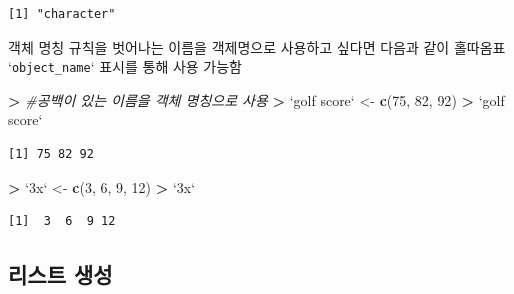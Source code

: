 \documentclass[
  11pt,
]{krantz}
\makeatletter
\newenvironment{Shaded}{\begin{snugshade}}{\end{snugshade}}
\newcommand{\CommentTok}[1]{\textcolor[rgb]{0.37,0.37,0.37}{\textit{#1}}}
\newcommand{\DataTypeTok}[1]{\textcolor[rgb]{0.27,0.27,0.27}{#1}}
\newcommand{\DecValTok}[1]{\textcolor[rgb]{0.06,0.06,0.06}{#1}}
\newcommand{\ErrorTok}[1]{\textcolor[rgb]{0.14,0.14,0.14}{\textbf{#1}}}
\newcommand{\KeywordTok}[1]{\textcolor[rgb]{0.27,0.27,0.27}{\textbf{#1}}}
\newcommand{\NormalTok}[1]{#1}
\newcommand{\OperatorTok}[1]{\textcolor[rgb]{0.43,0.43,0.43}{\textbf{#1}}}
\newcommand{\StringTok}[1]{\textcolor[rgb]{0.5,0.5,0.5}{#1}}
\newenvironment{kframe}{%
\medskip{}
\setlength{\fboxsep}{.8em}
 \def\at@end@of@kframe{}%
 \ifinner\ifhmode%
  \def\at@end@of@kframe{\end{minipage}}%
  \begin{minipage}{\columnwidth}%
 \fi\fi%
 \def\FrameCommand##1{\hskip\@totalleftmargin \hskip-\fboxsep
 \colorbox{shadecolor}{##1}\hskip-\fboxsep
     \hskip-\linewidth \hskip-\@totalleftmargin \hskip\columnwidth}%
 \MakeFramed {\advance\hsize-\width
   \@totalleftmargin\z@ \linewidth\hsize
   \@setminipage}}%
 {\par\unskip\endMakeFramed%
 \at@end@of@kframe}
\newenvironment{rmdblock}[1]
  {
  \begin{itemize}
  \renewcommand{\labelitemi}{
    \raisebox{-.7\height}[0pt][0pt]{
      {\setkeys{Gin}{width=3em,keepaspectratio}\texttt{[image: images/\#1]}}
    }
  }
  \setlength{\fboxsep}{1em}
  \begin{kframe}
  \item
  }
  {
  \end{kframe}
  \end{itemize}
  }
\newenvironment{rmdtip}
  {\begin{rmdblock}{tip}}
  {\end{rmdblock}}
\makeatother
\begin{document}
\begin{verbatim}
[1] "character"
\end{verbatim}

\normalsize

\footnotesize

\begin{rmdtip}
\begin{rmdtip}

객체 명칭 규칙을 벗어나는 이름을 객제명으로 사용하고 싶다면 다음과 같이 홀따옴표 `\texttt{object\_name}` 표시를 통해 사용 가능함

\end{rmdtip}
\end{rmdtip}

\normalsize

\footnotesize

\begin{Shaded}
\begin{Highlighting}[]
\OperatorTok{>}\StringTok{ }\CommentTok{#공백이 있는 이름을 객체 명칭으로 사용}
\ErrorTok{>}\StringTok{ `}\DataTypeTok{golf score}\StringTok{`}\NormalTok{ <-}\StringTok{ }\KeywordTok{c}\NormalTok{(}\DecValTok{75}\NormalTok{, }\DecValTok{82}\NormalTok{, }\DecValTok{92}\NormalTok{)}
\OperatorTok{>}\StringTok{ `}\DataTypeTok{golf score}\StringTok{`}
\end{Highlighting}
\end{Shaded}

\begin{verbatim}
[1] 75 82 92
\end{verbatim}

\begin{Shaded}
\begin{Highlighting}[]
\OperatorTok{>}\StringTok{ `}\DataTypeTok{3x}\StringTok{`}\NormalTok{ <-}\StringTok{ }\KeywordTok{c}\NormalTok{(}\DecValTok{3}\NormalTok{, }\DecValTok{6}\NormalTok{, }\DecValTok{9}\NormalTok{, }\DecValTok{12}\NormalTok{)}
\OperatorTok{>}\StringTok{ `}\DataTypeTok{3x}\StringTok{`}
\end{Highlighting}
\end{Shaded}

\begin{verbatim}
[1]  3  6  9 12
\end{verbatim}

\normalsize

\hypertarget{make-list}{%
\subsection{리스트 생성}\label{make-list}}
\end{document}
